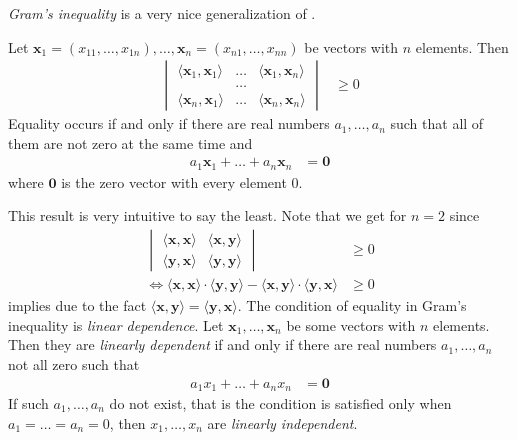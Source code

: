\documentclass{subfile}
\begin{document}
	\textit{Gram's inequality} is a very nice generalization of .
		\begin{theorem}
			Let $\mathbf{x}_1=(x_{11},\ldots,x_{1n}),\ldots,\mathbf{x}_n=(x_{n1},\ldots,x_{nn})$ be vectors with $n$ elements. Then
				\begin{align*}
					\begin{vmatrix}
						\langle \mathbf{x}_{1},\mathbf{x}_{1}\rangle & \ldots & \langle \mathbf{x}_{1},\mathbf{x}_{n}\rangle\\
						& \ldots & \\
						\langle \mathbf{x}_{n},\mathbf{x}_{1}\rangle & \ldots & \langle \mathbf{x}_{n},\mathbf{x}_{n}\rangle
					\end{vmatrix}
						& \geq0
				\end{align*}
			Equality occurs if and only if there are real numbers $a_1,\ldots,a_n$ such that all of them are not zero at the same time and
				\begin{align*}
					a_{1}\mathbf{x}_{1}+\ldots+a_{n}\mathbf{x}_{n}
						& = \mathbf{0}
				\end{align*}
			where $\mathbf{0}$ is the zero vector with every element $0$.
		\end{theorem}
	This result is very intuitive to say the least. Note that we get  for $n=2$ since
		\begin{align*}
			\begin{vmatrix}
				\langle\mathbf{x},\mathbf{x}\rangle & \langle\mathbf{x},\mathbf{y}\rangle\\
				\langle\mathbf{y},\mathbf{x}\rangle & \langle\mathbf{y},\mathbf{y}\rangle
			\end{vmatrix}
				& \geq0\\
			\iff\langle\mathbf{x},\mathbf{x}\rangle\cdot\langle\mathbf{y},\mathbf{y}\rangle-\langle\mathbf{x},\mathbf{y}\rangle\cdot\langle\mathbf{y},\mathbf{x}\rangle
				& \geq0
		\end{align*}
	implies  due to the fact $\langle\mathbf{x},\mathbf{y}\rangle=\langle\mathbf{y},\mathbf{x}\rangle$. The condition of equality in Gram's inequality is \textit{linear dependence}. Let $\mathbf{x}_{1},\ldots,\mathbf{x}_{n}$ be some vectors with $n$ elements. Then they are \textit{linearly dependent} if and only if there are real numbers $a_{1},\ldots,a_{n}$ not all zero such that
		\begin{align*}
			a_{1}x_{1}+\ldots+a_{n}x_{n}
				& = \mathbf{0}
		\end{align*}
	If such $a_{1},\ldots,a_{n}$ do not exist, that is the condition is satisfied only when $a_{1}=\ldots=a_{n}=0$, then $x_{1},\ldots,x_{n}$ are \textit{linearly independent}.
\end{document}
